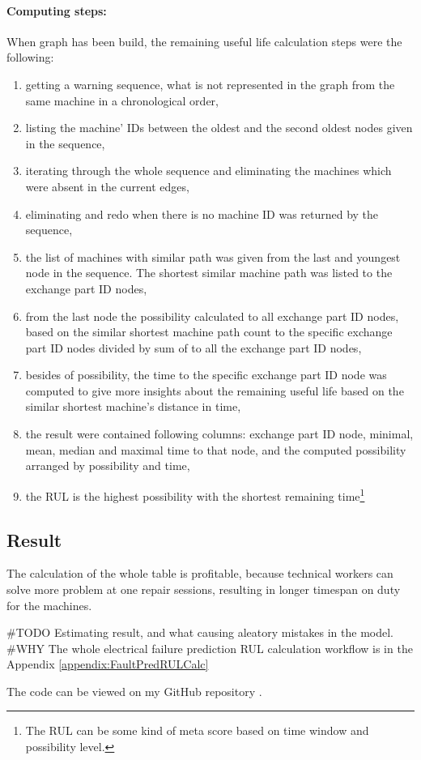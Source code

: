 			\paragraph{Computing steps:}
			When graph has been build, the remaining useful life calculation steps were the following:
			\begin{enumerate}
				\item{getting a warning sequence, what is not represented in the graph from the same machine in a chronological order,}
				\item{listing the machine' IDs between the oldest and the second oldest nodes given in the sequence,}
				\item{iterating through the whole sequence and eliminating the machines which were absent in the current edges,}
				\item{eliminating and redo when there is no machine ID was returned by the sequence,}
				\item{the list of machines with similar path was given from the last and youngest node in the sequence. The shortest similar machine path was listed to the exchange part ID nodes,}
				\item{from the last node the possibility calculated to all exchange part ID nodes, based on the similar shortest machine path count to the specific exchange part ID nodes divided by sum of to all the exchange part ID nodes,}
				\item{besides of possibility, the time to the specific exchange part ID node was computed to give more insights about the remaining useful life based on the similar shortest machine's distance in time,}
				\item{the result were contained following columns: exchange part ID node, minimal, mean, median and maximal time to that node, and the computed possibility arranged by possibility and time,} 
		 		\item{the RUL is the highest possibility with the shortest remaining time\footnote{The RUL can be some kind of meta score based on time window and possibility level.}}
		 	\end{enumerate}
	\subsection{Result}
The calculation of the whole table is profitable, because technical workers can solve more problem at one repair sessions, resulting in longer timespan on duty for the machines.

\#TODO Estimating result, and what causing aleatory mistakes in the model. 
\#WHY
The whole electrical failure prediction RUL calculation workflow is in the Appendix \ref{appendix:FaultPredRULCalc}

The code can be viewed on my GitHub repository \cite{GitHub_FP_RUL}.
